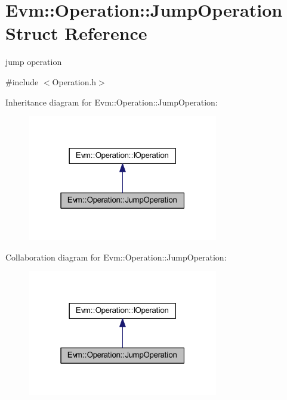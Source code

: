 \hypertarget{struct_evm_1_1_operation_1_1_jump_operation}{}\section{Evm\+:\+:Operation\+:\+:Jump\+Operation Struct Reference}
\label{struct_evm_1_1_operation_1_1_jump_operation}


jump operation  




{\ttfamily \#include $<$Operation.\+h$>$}



Inheritance diagram for Evm\+:\+:Operation\+:\+:Jump\+Operation\+:
\nopagebreak
\begin{figure}[H]
\begin{center}
\leavevmode
\includegraphics[width=235pt]{struct_evm_1_1_operation_1_1_jump_operation__inherit__graph}
\end{center}
\end{figure}


Collaboration diagram for Evm\+:\+:Operation\+:\+:Jump\+Operation\+:
\nopagebreak
\begin{figure}[H]
\begin{center}
\leavevmode
\includegraphics[width=235pt]{struct_evm_1_1_operation_1_1_jump_operation__coll__graph}
\end{center}
\end{figure}
